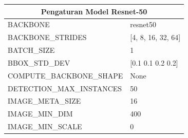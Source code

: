 \begin{longtable}[h]{|l|l|}
		\hline
		\multicolumn{2}{|c|}{\textbf{Pengaturan Model Resnet-50}}                                                                                                                                                                         \\ \hline
		BACKBONE                        & resnet50                                                                                                                                                                              \\ \hline
		BACKBONE\_STRIDES               & {[}4, 8, 16, 32, 64{]}                                                                                                                                                                 \\ \hline
		BATCH\_SIZE                     & 1                                                                                                                                                                                      \\ \hline
		BBOX\_STD\_DEV                  & {[}0.1 0.1 0.2 0.2{]}                                                                                                                                                                  \\ \hline
		COMPUTE\_BACKBONE\_SHAPE        & None                                                                                                                                                                                   \\ \hline
		DETECTION\_MAX\_INSTANCES       &	 50                                                    	\\ \hline
		IMAGE\_META\_SIZE               & 16                                                                                                                                                                                     \\ \hline
		IMAGE\_MIN\_DIM                 & 400                                                                                                                                                                                    \\ \hline
		IMAGE\_MIN\_SCALE               & 0                                                                                                                                                                                      \\ \hline

\end{longtable}
